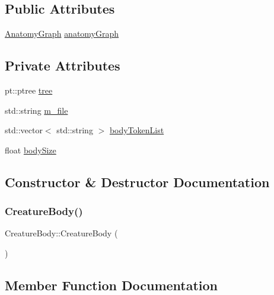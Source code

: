 \subsection*{Public Attributes}
\begin{DoxyCompactItemize}
\item 
\mbox{\hyperlink{_body_graph_8hpp_ab01b157c2e143191570b012d275fbf0d}{Anatomy\+Graph}} \mbox{\hyperlink{class_creature_body_aa0fc6dc283a463e31f34c0ce9c2f1182}{anatomy\+Graph}}
\end{DoxyCompactItemize}
\subsection*{Private Attributes}
\begin{DoxyCompactItemize}
\item 
pt\+::ptree \mbox{\hyperlink{class_creature_body_aa7e0155e84f81f2fb5fda0696d17ab27}{tree}}
\item 
std\+::string \mbox{\hyperlink{class_creature_body_a7bb511e3d385b86c65613a627f33bd20}{m\+\_\+file}}
\item 
std\+::vector$<$ std\+::string $>$ \mbox{\hyperlink{class_creature_body_ad882f21d3166e49c5b8def87121bb9c0}{body\+Token\+List}}
\item 
float \mbox{\hyperlink{class_creature_body_ae91bf63d2607dc4ee6e56fb1b7558fa4}{body\+Size}}
\end{DoxyCompactItemize}


\subsection{Constructor \& Destructor Documentation}
\mbox{\label{class_creature_body_ad40931736728dce1b6cf2c235c883695}} 
\subsubsection{\texorpdfstring{Creature\+Body()}{CreatureBody()}}
{\footnotesize\ttfamily Creature\+Body\+::\+Creature\+Body (\begin{DoxyParamCaption}{ }\end{DoxyParamCaption})}



\subsection{Member Function Documentation}
\mbox{\label{class_creature_body_aa6525bf32e8f99cc5bd1bda76044964d}} 
